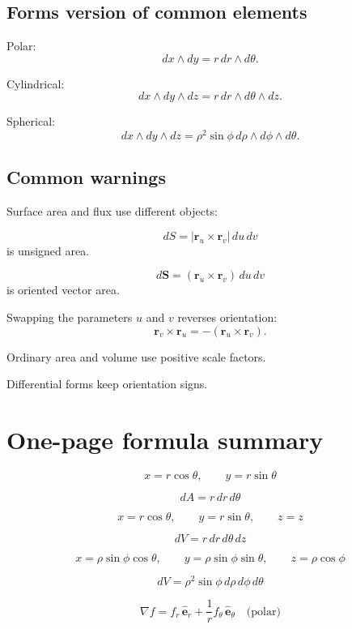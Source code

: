 \subsection*{Forms version of common elements}

Polar:
\[
\boxed{
    dx\wedge dy
    =
    r\,dr\wedge d\theta.
}
\]

Cylindrical:
\[
\boxed{
    dx\wedge dy\wedge dz
    =
    r\,dr\wedge d\theta\wedge dz.
}
\]

Spherical:
\[
\boxed{
    dx\wedge dy\wedge dz
    =
    \rho^2\sin\phi\,
    d\rho\wedge d\phi\wedge d\theta.
}
\]

\subsection*{Common warnings}

Surface area and flux use different objects:

\[
\boxed{
    dS=|\mathbf r_u\times\mathbf r_v|\,du\,dv
}
\]
is unsigned area.

\[
\boxed{
    d\mathbf S=(\mathbf r_u\times\mathbf r_v)\,du\,dv
}
\]
is oriented vector area.

Swapping the parameters \(u\) and \(v\) reverses orientation:
\[
\boxed{
    \mathbf r_v\times\mathbf r_u
    =
    -(\mathbf r_u\times\mathbf r_v).
}
\]

Ordinary area and volume use positive scale factors.

Differential forms keep orientation signs.

\section*{One-page formula summary}

\[
\boxed{
    x=r\cos\theta,\qquad y=r\sin\theta
}
\]

\[
\boxed{
    dA=r\,dr\,d\theta
}
\]

\[
\boxed{
    x=r\cos\theta,\qquad y=r\sin\theta,\qquad z=z
}
\]

\[
\boxed{
    dV=r\,dr\,d\theta\,dz
}
\]

\[
\boxed{
    x=\rho\sin\phi\cos\theta,
    \qquad
    y=\rho\sin\phi\sin\theta,
    \qquad
    z=\rho\cos\phi
}
\]

\[
\boxed{
    dV=\rho^2\sin\phi\,d\rho\,d\phi\,d\theta
}
\]

\[
\boxed{
    \nabla f
    =
    f_r\,\widehat{\mathbf e}_r
    +
    \frac1r f_\theta\,\widehat{\mathbf e}_\theta
    \quad\text{(polar)}
}
\]

